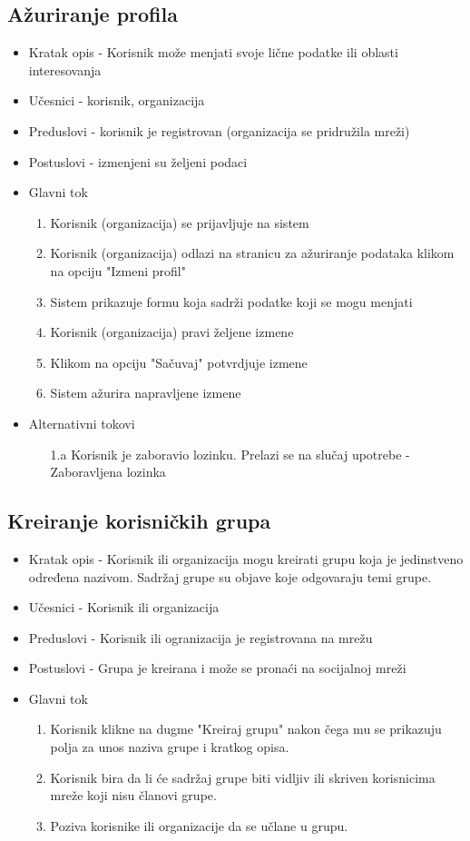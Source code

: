 \subsection{Ažuriranje profila}
\begin{itemize}
	\item Kratak opis - Korisnik može menjati svoje lične podatke ili oblasti interesovanja
	\item Učesnici - korisnik, organizacija
	\item Preduslovi - korisnik je registrovan (organizacija se pridružila mreži)
	\item Postuslovi - izmenjeni su željeni podaci
	\item Glavni tok
	\begin{enumerate}
		\item Korisnik (organizacija) se prijavljuje na sistem
		\item Korisnik (organizacija) odlazi na stranicu za ažuriranje podataka klikom na opciju "Izmeni profil"
		\item Sistem prikazuje formu koja sadrži podatke koji se mogu menjati
		\item Korisnik (organizacija) pravi željene izmene
		\item Klikom na opciju "Sačuvaj" potvrdjuje izmene
		\item Sistem ažurira napravljene izmene
	\end{enumerate}
	\item Alternativni tokovi
    \begin{itemize}
    	\item[1.a] Korisnik je zaboravio lozinku. Prelazi se na slučaj upotrebe - Zaboravljena lozinka
    \end{itemize}
\end{itemize}

\subsection{Kreiranje korisničkih grupa}
\begin{itemize}
	\item Kratak opis - Korisnik ili organizacija mogu kreirati grupu koja je jedinstveno određena nazivom. Sadržaj grupe su objave koje odgovaraju temi grupe.
	\item Učesnici - Korisnik ili organizacija
	\item Preduslovi - Korisnik ili ogranizacija je registrovana na mrežu
	\item Postuslovi - Grupa je kreirana i može se pronaći na socijalnoj mreži 
	\item Glavni tok
    \begin{enumerate}
		\item Korisnik klikne na dugme "Kreiraj grupu" nakon čega mu se prikazuju polja za unos naziva grupe i kratkog opisa.
		\item Korisnik bira da li će sadržaj grupe biti vidljiv ili skriven korisnicima mreže koji nisu članovi grupe.
		\item Poziva korisnike ili organizacije da se učlane u grupu.
    \end{enumerate}
\end{itemize}


